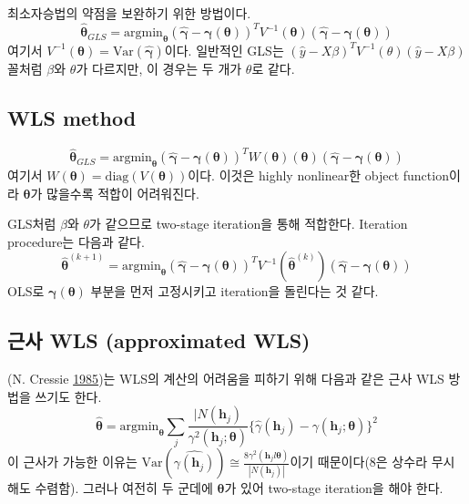 \documentclass[b5paper,]{book}
\theoremstyle{definition}
\theoremstyle{definition}
\theoremstyle{definition}
\theoremstyle{remark}
\begin{document}
최소자승법의 약점을 보완하기 위한 방법이다.
\[\hat{\boldsymbol{\theta}}_{GLS}=\text{argmin}_{\boldsymbol{\theta}}(\hat{\boldsymbol{\gamma}}-\boldsymbol{\gamma}(\boldsymbol{\theta}))^{T}V^{-1}(\boldsymbol{\theta})(\hat{\boldsymbol{\gamma}}-\boldsymbol{\gamma}(\boldsymbol{\theta}))\]
여기서
\(V^{-1}(\boldsymbol{\theta})=\text{Var}(\hat{\boldsymbol{\gamma}})\)이다.
일반적인 GLS는
\((\hat{y}-X\beta)^{T}V^{-1}(\theta)(\hat{y}-X\beta)\)꼴처럼 \(\beta\)와
\(\theta\)가 다르지만, 이 경우는 두 개가 \(\theta\)로 같다.

\subsection{WLS method}\label{wls-method}

\[\hat{\boldsymbol{\theta}}_{GLS}=\text{argmin}_{\boldsymbol{\theta}}(\hat{\boldsymbol{\gamma}}-\boldsymbol{\gamma}(\boldsymbol{\theta}))^{T}W(\boldsymbol{\theta})(\boldsymbol{\theta})(\hat{\boldsymbol{\gamma}}-\boldsymbol{\gamma}(\boldsymbol{\theta}))\]
여기서
\(W(\boldsymbol{\theta})=\text{diag}(V(\boldsymbol{\theta}))\)이다.
이것은 highly nonlinear한 object function이라 \(\boldsymbol{\theta}\)가
많을수록 적합이 어려워진다.

GLS처럼 \(\beta\)와 \(\theta\)가 같으므로 two-stage iteration을 통해
적합한다. Iteration procedure는 다음과 같다.
\[\hat{\boldsymbol{\theta}}^{(k+1)}=\text{argmin}_{\boldsymbol{\theta}}(\hat{\boldsymbol{\gamma}}-\boldsymbol{\gamma}(\boldsymbol{\theta}))^{T}V^{-1}(\hat{\boldsymbol{\theta}}^{(k)})(\hat{\boldsymbol{\gamma}}-\boldsymbol{\gamma}(\boldsymbol{\theta}))\]
OLS로 \(\boldsymbol{\gamma}(\boldsymbol{\theta})\) 부분을 먼저
고정시키고 iteration을 돌린다는 것 같다.

\subsection{근사 WLS (approximated WLS)}\label{-wls-approximated-wls}

(N. Cressie \protect\hyperlink{ref-Cressie1985}{1985})는 WLS의 계산의
어려움을 피하기 위해 다음과 같은 근사 WLS 방법을 쓰기도 한다.
\[\hat{\boldsymbol{\theta}}=\text{argmin}_{\boldsymbol{\theta}}\sum_{j}\frac{|N(\mathbf{h}_{j})}{\gamma^{2}(\mathbf{h}_{j};\boldsymbol{\theta})}\{ \hat{\gamma}(\mathbf{h}_{j})-\gamma(\mathbf{h}_{j};\boldsymbol{\theta}) \}^{2}\]
이 근사가 가능한 이유는
\(\text{Var}(\hat{\gamma(\mathbf{h}_{j})}) \cong \frac{8 \gamma^{2}(\mathbf{h}_{j}l\boldsymbol{\theta})}{|N(\mathbf{h}_{j})|}\)이기
때문이다(8은 상수라 무시해도 수렴함). 그러나 여전히 두 군데에
\(\boldsymbol{\theta}\)가 있어 two-stage iteration을 해야 한다.
\end{document}
